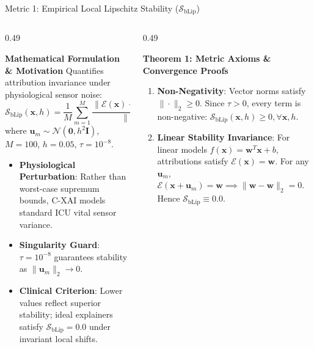 \documentclass[aspectratio=169,10pt]{beamer}
\begin{document}
\begin{frame}{Metric 1: Empirical Local Lipschitz Stability ($\mathcal{S}_{\text{bLip}}$)}
  \vspace{-0.1cm}
  \begin{columns}[t]
    \begin{column}{0.49\textwidth}
      \begin{block}{\textbf{Mathematical Formulation \& Motivation}}
        \scriptsize
        Quantifies attribution invariance under physiological sensor noise:
        $$\mathcal{S}_{\text{bLip}}(\mathbf{x}, h) = \frac{1}{M} \sum_{m=1}^{M} \frac{\|\mathcal{E}(\mathbf{x}) - \mathcal{E}(\mathbf{x} + \mathbf{u}_m)\|_2}{\|\mathbf{u}_m\|_2 + \tau}$$
        where $\mathbf{u}_m \sim \mathcal{N}(\mathbf{0}, h^2 \mathbf{I})$, $M = 100$, $h = 0.05$, $\tau = 10^{-8}$.
        \vspace{2pt}
        \begin{itemize}\setlength\itemsep{1.5pt}
          \item \textbf{Physiological Perturbation}: Rather than worst-case supremum bounds, C-XAI models standard ICU vital sensor variance.
          \item \textbf{Singularity Guard}: $\tau = 10^{-8}$ guarantees stability as $\|\mathbf{u}_m\|_2 \to 0$.
          \item \textbf{Clinical Criterion}: Lower values reflect superior stability; ideal explainers satisfy $\mathcal{S}_{\text{bLip}} = 0.0$ under invariant local shifts.
        \end{itemize}
      \end{block}
    \end{column}
    \begin{column}{0.49\textwidth}
      \begin{exampleblock}{\textbf{Theorem 1: Metric Axioms \& Convergence Proofs}}
        \scriptsize
        \begin{enumerate}\setlength\itemsep{1.5pt}
          \item \textbf{Non-Negativity}: Vector norms satisfy $\|\cdot\|_2 \ge 0$. Since $\tau > 0$, every term is non-negative: $\mathcal{S}_{\text{bLip}}(\mathbf{x}, h) \ge 0, \forall \mathbf{x}, h$.
          \item \textbf{Linear Stability Invariance}: For linear models $f(\mathbf{x}) = \mathbf{w}^T \mathbf{x} + b$, attributions satisfy $\mathcal{E}(\mathbf{x}) = \mathbf{w}$. For any $\mathbf{u}_m$, $\mathcal{E}(\mathbf{x} + \mathbf{u}_m) = \mathbf{w} \implies \|\mathbf{w} - \mathbf{w}\|_2 = 0$. Hence $\mathcal{S}_{\text{bLip}} \equiv 0.0$.

\end{enumerate}
\end{exampleblock}
\end{column}
\end{columns}
\end{frame}
\end{document}
